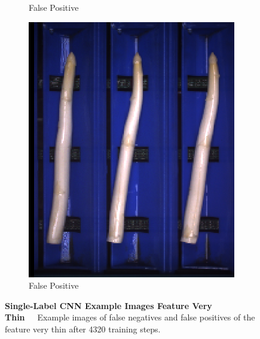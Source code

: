 \begin{figure}[h]
\begin{subfigure}{0.3\textwidth}
		\vspace{-5pt}
		\caption{False Positive}
	\end{subfigure}
	\begin{subfigure}{0.3\textwidth}
		\includegraphics[width=0.9\linewidth]{Figures/appendix/verythin_falsepositive_03.png}
		\vspace{-5pt}
		\caption{False Positive}
	\end{subfigure}
	\caption[Single-Label CNN Example Images Feature Very Thin]{\textbf{Single-Label CNN Example Images Feature Very Thin}~~~Example images of false negatives and false positives of the feature very thin after 4320 training steps.}
	\vspace{-20pt}
    \label{fig:ExampleImagesVeryThin}
\end{figure}

